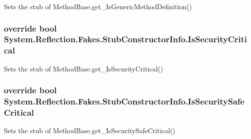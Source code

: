 Sets the stub of Method\-Base.\-get\-\_\-\-Is\-Generic\-Method\-Definition()

\hypertarget{class_system_1_1_reflection_1_1_fakes_1_1_stub_constructor_info_aa16072e9ccbdf4d1337d40f2b4b9170c}{
\subsubsection[{Is\-Security\-Critical}]{\setlength{\rightskip}{0pt plus 5cm}override bool System.\-Reflection.\-Fakes.\-Stub\-Constructor\-Info.\-Is\-Security\-Critical\hspace{0.3cm}{\ttfamily [get]}}}\label{class_system_1_1_reflection_1_1_fakes_1_1_stub_constructor_info_aa16072e9ccbdf4d1337d40f2b4b9170c}


Sets the stub of Method\-Base.\-get\-\_\-\-Is\-Security\-Critical()

\hypertarget{class_system_1_1_reflection_1_1_fakes_1_1_stub_constructor_info_a49521c154c5bc2c79944aec45ff2a40b}{
\subsubsection[{Is\-Security\-Safe\-Critical}]{\setlength{\rightskip}{0pt plus 5cm}override bool System.\-Reflection.\-Fakes.\-Stub\-Constructor\-Info.\-Is\-Security\-Safe\-Critical\hspace{0.3cm}{\ttfamily [get]}}}\label{class_system_1_1_reflection_1_1_fakes_1_1_stub_constructor_info_a49521c154c5bc2c79944aec45ff2a40b}


Sets the stub of Method\-Base.\-get\-\_\-\-Is\-Security\-Safe\-Critical()

